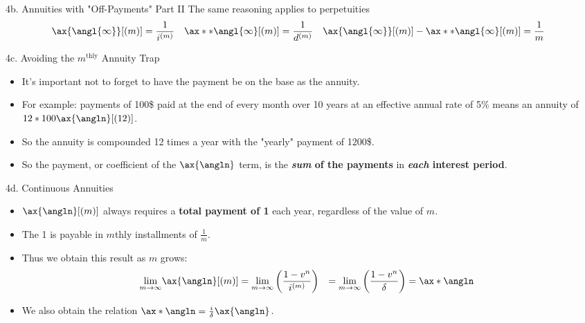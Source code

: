 \begin{CHPT_SUMM_AUTO}[label = {L.-4b}]{4b. Annuities with "Off-Payments" Part II}
The same reasoning applies to perpetuities
	\begin{align*}
	\ax{\angl{\infty}}[(m)]		&=	\frac{1}{i^{(m)}}	&
	\ax**{\angl{\infty}}[(m)]	&=	\frac{1}{d^{(m)}}	&
	\ax{\angl{\infty}}[(m)] - \ax**{\angl{\infty}}[(m)]	&=	\frac{1}{m}	
	\end{align*}

\end{CHPT_SUMM_AUTO}

\begin{CHPT_SUMM_AUTO}[label = {L.-4c}]{4c. Avoiding the $m^{\text{thly}}$ Annuity Trap}
	\begin{itemize}[leftmargin = *]
		\item	It's important not to forget to have the payment be on the base as the annuity.
		\item	For example: payments of 100\$ paid at the end of every month over 10 years at an effective annual rate of 5\% means an annuity of $12 * 100 \ax{\angln}[(12)]$.
		\item[]	So the annuity is compounded 12 times a year with the "yearly" payment of 1200\$.
		\item	So the payment, or coefficient of the $\ax{\angln}$ term, is the \textbf{\textit{sum} of the payments} in \textbf{\textit{each} interest period}.
	\end{itemize}
\end{CHPT_SUMM_AUTO}

\begin{CHPT_SUMM_AUTO}[label = {L.-4d}]{4d. Continuous Annuities}
\begin{itemize}[leftmargin = *]
		\item	$\ax{\angln}[(m)]$ always requires a \textbf{total payment of 1} each year, regardless of the value of $m$.
		\item	The 1 is payable in $m$thly installments of $\frac{1}{m}$.
		\item	Thus we obtain this result as $m$ grows:
			\begin{align*}
			\underset{m \rightarrow \infty}{\lim} \ax{\angln}[(m)]
			&=	\underset{m \rightarrow \infty}{\lim} \left( \frac{1 - v^{n}}{i^{(m)}} \right)
			&=	\underset{m \rightarrow \infty}{\lim} \left( \frac{1 - v^{n}}{\delta} \right)
			&=	\ax*{\angln}
			\end{align*}
		\item	We also obtain the relation $\ax*{\angln} = \frac{i}{\delta}\ax{\angln}$.
\end{itemize}
\end{CHPT_SUMM_AUTO}

